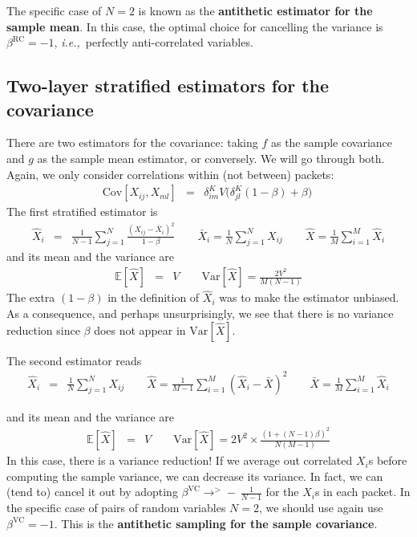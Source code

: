 \documentclass{aastex6}
\newcommand{\ie}{{\textit{i.e.,}~}}
\newcommand{\eqn}[1]{\begin{eqnarray}#1\end{eqnarray}}
\begin{document}
The specific case of $N=2$ is known as the \textbf{antithetic estimator for the sample mean}. In this case, the optimal choice for cancelling the variance is $\beta^\mathrm{RC}=-1$, \ie perfectly anti-correlated variables. 

\subsection{Two-layer stratified estimators for the covariance}

There are two estimators for the covariance: taking $f$ as the sample covariance and $g$ as the sample mean estimator, or conversely. We will go through both. Again, we only consider correlations within (not between) packets:
\eqn{
	\mathrm{Cov}[X_{ij}, X_{ml}] &=& \delta^K_{im} V \bigl(\delta^K_{jl}(1-\beta) + \beta\bigr) \ 
}
The first stratified estimator is
\eqn{
	\hat{X}_i &=& \frac{1}{N-1}\sum_{j=1}^N \frac{(X_{ij} - \bar{X}_{i})^2}{1-\beta}	\quad\quad \bar{X}_{i}	=  \frac{1}{N}\sum_{j=1}^N X_{ij}	\quad\quad \hat{X} =  \frac{1}{M}\sum_{i=1}^M \hat{X}_i 
}
and its mean and the variance are
\eqn{
	\mathbb{E}[\hat{X}] 	&=&	V 	\quad \quad\mathrm{Var}[\hat{X}] = \frac{2V^2}{M(N-1)} 
}
The extra $ (1-\beta)$ in the definition of $\hat{X}_i$ was to make the estimator unbiased. As a consequence, and perhaps unsurprisingly, we see that there is no variance reduction since $\beta$ does not appear in $\mathrm{Var}[\hat{X}]$.

The second estimator reads
\eqn{
	\hat{X}_i &=& \frac{1}{N}\sum_{j=1}^N X_{ij}	\quad\quad
	\hat{X} =  \frac{1}{M-1}\sum_{i=1}^M (\hat{X}_i  - \bar{X})^2 \quad\quad
	\bar{X} =  \frac{1}{M}\sum_{i=1}^M \hat{X}_i
}

and its mean and the variance are
\eqn{
	\mathbb{E}[\hat{X}] &=& V \quad\quad
	 \mathrm{Var}[\hat{X}] = 2V^2 \times \frac{(1 + (N-1)\beta)^2}{N (M-1)}
}
In this case, there is a variance reduction! If we average out correlated $X_i$s before computing the sample variance, we can decrease its variance. In fact, we can (tend to) cancel it out by adopting $\beta^\mathrm{VC} \rightarrow^{>} - \ \frac{1}{N-1}$ for the $X_i$s in each packet. In the specific case of pairs of random variables $N=2$, we should use again use $\beta^\mathrm{VC} = -1$. This is the \textbf{antithetic sampling for the sample covariance}.
\end{document}
